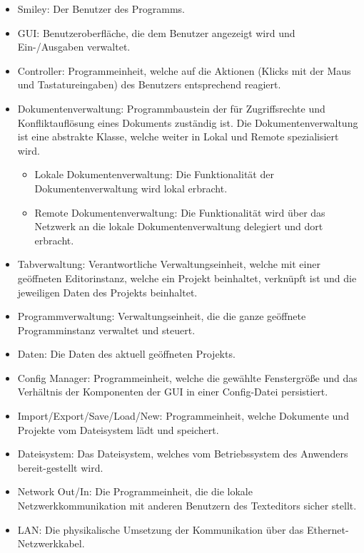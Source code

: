 \documentclass{scrartcl}
\begin{document}
\begin{itemize}
\item Smiley: Der Benutzer des Programms.

\item GUI: Benutzeroberfläche, die dem Benutzer angezeigt wird und Ein-/Ausgaben verwaltet.
\item Controller: Programmeinheit, welche auf die Aktionen (Klicks mit der Maus und Tastatureingaben) des Benutzers entsprechend reagiert.

\item Dokumentenverwaltung: Programmbaustein der für Zugriffsrechte und Konfliktauflösung eines Dokuments zuständig ist. Die Dokumentenverwaltung ist eine abstrakte Klasse, welche weiter in Lokal und Remote spezialisiert wird.

\begin{itemize}
\item Lokale Dokumentenverwaltung: Die Funktionalität der Dokumentenverwaltung wird lokal erbracht.
\item Remote Dokumentenverwaltung: Die Funktionalität wird über das Netzwerk an die lokale Dokumentenverwaltung delegiert und dort erbracht.
\end{itemize}

\item Tabverwaltung: Verantwortliche Verwaltungseinheit, welche mit einer geöffneten Editorinstanz, welche ein Projekt beinhaltet, verknüpft ist und die jeweiligen Daten des Projekts beinhaltet.

\item Programmverwaltung: Verwaltungseinheit, die die ganze geöffnete Programminstanz verwaltet und steuert.

\item Daten: Die Daten des aktuell geöffneten Projekts.
\item Config Manager: Programmeinheit, welche die gewählte Fenstergröße und das Verhältnis der Komponenten der GUI in einer Config-Datei persistiert.

\item Import/Export/Save/Load/New: Programmeinheit, welche Dokumente und Projekte vom Dateisystem lädt und speichert.

\item Dateisystem: Das Dateisystem, welches vom Betriebssystem des Anwenders bereit-gestellt wird.
\item Network Out/In: Die Programmeinheit, die die lokale Netzwerkkommunikation mit anderen Benutzern des Texteditors sicher stellt.
\item LAN: Die physikalische Umsetzung der Kommunikation über das Ethernet-Netzwerkkabel.
\end{itemize}
\end{document}
